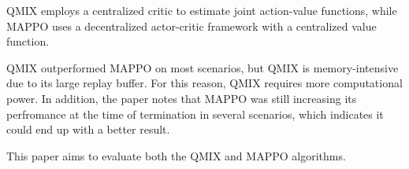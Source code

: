\documentclass[conference]{IEEEtran}
\begin{document}
QMIX employs a centralized critic to estimate joint action-value functions, while MAPPO uses a decentralized
actor-critic framework with a centralized value function.

QMIX outperformed MAPPO on most scenarios, but QMIX is memory-intensive due to its large replay buffer. For
this reason, QMIX requires more computational power. In addition, the paper notes that MAPPO was still
increasing its perfromance at the time of termination in several scenarios, which indicates it could end up
with a better result.

This paper aims to evaluate both the QMIX and MAPPO algorithms.

\noindent






\end{document}
